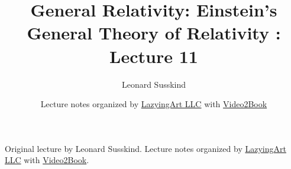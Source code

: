 \documentclass[11pt,oneside]{book}
\begin{document}
\frontmatter
\title{General Relativity: Einstein's General Theory of Relativity : Lecture 11}
\author{Leonard Susskind}
\date{Lecture notes organized by \href{https://lazying.art}{LazyingArt LLC} with \href{https://github.com/lachlanchen/Video2Book}{Video2Book}}
\maketitle
\begin{center}
\small Original lecture by Leonard Susskind. Lecture notes organized by \href{https://lazying.art}{LazyingArt LLC} with \href{https://github.com/lachlanchen/Video2Book}{Video2Book}.
\end{center}
\clearpage
\mainmatter

\end{document}
